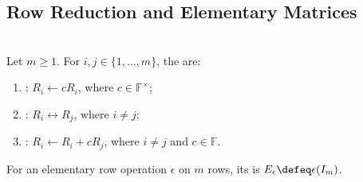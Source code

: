 \subsection{Row Reduction and Elementary Matrices}

\begin{definition} \label{def:elementary-row-operations-and-matrices} \\
Let $m\geq1$. For $i,j\in\{1,\ldots,m\}$, the  are:
\begin{enumerate}[label=(\roman*)]
\setlength{\itemsep}{0pt}
\item {}: $R_i\leftarrow cR_i$, where $c\in\mathbb{F}^{\times}$;
\item {}: $R_i\leftrightarrow R_j$, where $i\neq j$;
\item {}: $R_i\leftarrow R_i+cR_j$, where $i\neq j$ and $c\in\mathbb{F}$.
\end{enumerate}
For an elementary row operation $\epsilon$ on $m$ rows, its  is $E_{\epsilon}\defeq\epsilon(I_m)$.
\end{definition}

